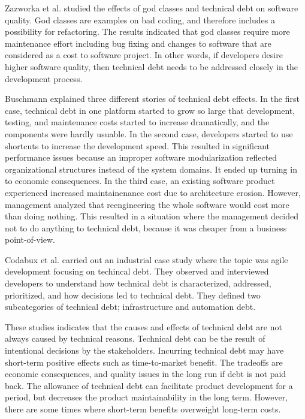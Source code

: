 Zazworka et al.\cite{zazworka2011investigating} studied the effects of god classes and technical debt on software quality. God classes are examples on bad coding, and therefore includes a possibility for refactoring\cite{Zazworka:2011:PDD:1985362.1985372}. The results indicated that god classes require more maintenance effort including bug fixing and changes to software that are considered as a cost to software project. In other words, if developers desire higher software quality, then technical debt needs to be addressed closely in the development process.

Buschmann\cite{buschmann2011pay} explained three different stories of technical debt effects. In the first case, technical debt in one platform started to grow so large that development, testing, and maintenance costs started to increase dramatically, and the components were hardly usuable. In the second case, developers started to use shortcuts to increase the development speed. This resulted in significant performance issues because an improper software modularization reflected organizational structures instead of the system domains. It ended up turning in to economic consequences. In the third case, an existing software product experienced increased maintainenance cost due to architecture erosion. However, management analyzed that reengineering the whole software would cost more than doing nothing. This resulted in a situation where the management decided not to do anything to technical debt, because it was cheaper from a business point-of-view.

Codabux et al.\cite{p8-codabux} carried out an industrial case study where the topic was agile development focusing on techincal debt. They observed and interviewed developers to understand how technical debt is characterized, addressed, prioritized, and how decisions led to technical debt. They defined two subcategories of technical debt; infrastructure and automation debt. 

These studies indicates that the causes and effects of technical debt are not always caused by technical reasons. Technical debt can be the result of intentional decisions by the stakeholders. Incurring technical debt may have short-term positive effects such as time-to-market benefit. The tradeoffs are economic consequences, and quality issues in the long run if debt is not paid back. The allowance of technical debt can facilitate product development for a period, but decreases the product maintainability in the long term. However, there are some times where short-term benefits overweight long-term costs. 

